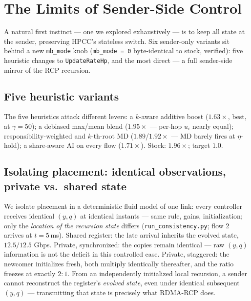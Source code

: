 \documentclass[sigconf, nonacm]{acmart}
\newcommand{\hpccfs}{\textsc{RDMA-RCP}\xspace}
\begin{document}
\section{The Limits of Sender-Side Control}
\label{sec:senderonly}

A natural first instinct --- one we explored exhaustively --- is to keep all state at the
sender, preserving HPCC's stateless switch. Six sender-only variants sit behind a new
\texttt{mb\_mode} knob (\texttt{mb\_mode = 0} byte-identical to stock, verified): five
heuristic changes to \texttt{UpdateRateHp}, and the most direct --- a full sender-side mirror
of the RCP recursion.

\subsection{Five heuristic variants}

The five heuristics attack different levers: a $k$-aware additive boost ($1.63\times$,
best, at $\gamma{=}50$); a debiased max/mean blend ($1.95\times$ --- per-hop $u_i$ nearly
equal); responsibility-weighted and $k$-th-root MD ($1.89$/$1.92\times$ --- MD barely fires
at $\eta$-hold); a share-aware AI on every flow ($1.71\times$). Stock: $1.96\times$;
target $1.0$.

\subsection{Isolating placement: identical observations, private vs.\ shared state}
\label{sec:isolate}

We isolate placement in a deterministic fluid model of one link: every controller receives
identical $(y, q)$ at identical instants --- same rule, gains, initialization; only the
\emph{location of the recursion state} differs (\texttt{run\_consistency.py}; flow 2
arrives at $t{=}5$\,ms). Shared register: the late arrival inherits the evolved state,
$12.5/12.5$ Gbps. Private, synchronized: the copies remain identical --- raw $(y, q)$ information is not the
deficit in this controlled case. Private,
staggered: the newcomer initializes fresh, both multiply identically thereafter, and the ratio
freezes at exactly $2{:}1$. From an independently initialized local recursion, a sender
cannot reconstruct the register's \emph{evolved state}, even under identical subsequent
$(y, q)$ --- transmitting that state is precisely what \hpccfs does.
\end{document}
